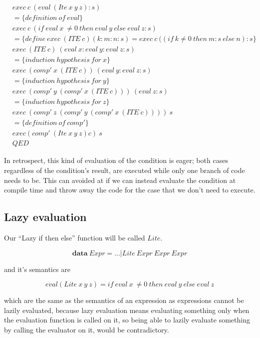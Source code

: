 \documentclass {article}
\begin{document}
\begin{align*}
	&exec \ c \ (eval \ (Ite \ x \ y \ z):s) \\
	&= \{definition \ of \ eval\} \\ 
	&exec \ c \ (if \ eval \ x \ \not= 0 \ then \ eval \ y \ else \ eval \ z :s) \\
	&= \{define\: exec \ (ITE \ c) (k : m : n : s) = exec \ c \ ((if \ k \not=0 \ then \ m : s\ else \ n) : s \} \\
	& exec \ (ITE \ c) \ (eval \ x : eval \ y : eval \ z : s) \\
	&= \{induction\ hypothesis \ for \ x \} \\
	& exec \ (comp' \ x \ (ITE \ c)) \ (eval \ y : eval \ z : s) \\
	&= \{induction\ hypothesis \ for \ y \} \\
	& exec \ (comp' \ y \ (comp' \ x \ (ITE \ c))) \ (eval \ z : s) \\
	&= \{induction\ hypothesis \ for \ z\} \\
	& exec \ (comp' \ z \ (comp' \ y \ (comp' \ x \ (ITE \ c)))) \ s \\
	&= \{definition \ of \ comp' \} \\
	& exec (comp' \ (Ite \ x \ y \ z) c)  \ s \\
	&QED
\end{align*} 

In retrospect, this kind of evaluation of the condition
is eager; both cases regardless of the
condition's result, are executed
while only one branch of code needs to be.
This can avoided at if we can instead
evaluate the condition at compile time
and throw away the code for the case
that we don't need to execute.

\subsection{Lazy evaluation}

\newcommand{\lite}{$Lite$}

Our ``Lazy if then else'' function
 will be called \lite.

	\[ \textbf{data} \ Expr = ... | Lite \ Expr \ Expr \ Expr \]

and it's semantics are

	\[eval(Lite \ x \ y \ z) = if \ eval \ x \ \not= 0 \ then \ eval \ y \ else \ eval \ z \]

which are the same as the semantics
of an \ite expression as 
expressions cannot be lazily evaluated,
because lazy evaluation means evaluating
something only when the evaluation function
is called on it,
so being able to lazily evaluate something 
by calling the evaluator on it,
would be contradictory.
\end{document}
